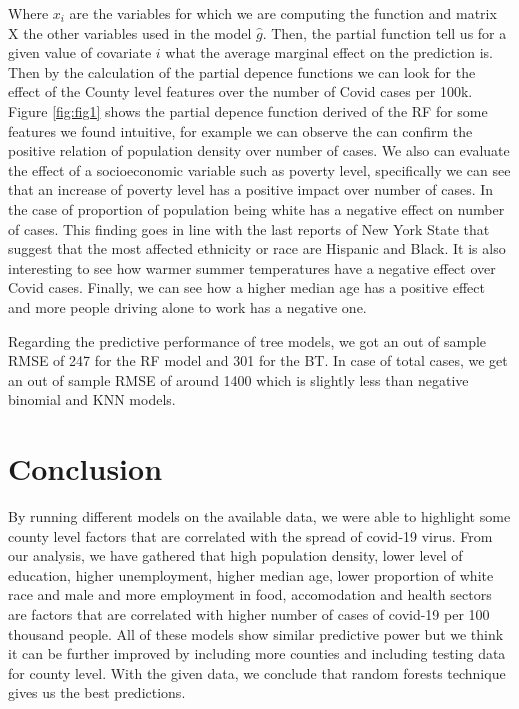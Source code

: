 \documentclass[
]{article}
\begin{document}
Where \(x_i\) are the variables for which we are computing the function
and matrix X the other variables used in the model \(\hat{g}\). Then,
the partial function tell us for a given value of covariate \(i\) what
the average marginal effect on the prediction is. Then by the
calculation of the partial depence functions we can look for the effect
of the County level features over the number of Covid cases per 100k.
Figure \ref{fig:fig1} shows the partial depence function derived of the
RF for some features we found intuitive, for example we can observe the
can confirm the positive relation of population density over number of
cases. We also can evaluate the effect of a socioeconomic variable such
as poverty level, specifically we can see that an increase of poverty
level has a positive impact over number of cases. In the case of
proportion of population being white has a negative effect on number of
cases. This finding goes in line with the last reports of New York State
that suggest that the most affected ethnicity or race are Hispanic and
Black. It is also interesting to see how warmer summer temperatures have
a negative effect over Covid cases. Finally, we can see how a higher
median age has a positive effect and more people driving alone to work
has a negative one.

Regarding the predictive performance of tree models, we got an out of
sample RMSE of 247 for the RF model and 301 for the BT. In case of total
cases, we get an out of sample RMSE of around 1400 which is slightly
less than negative binomial and KNN models.

\hypertarget{conclusion}{%
\section{Conclusion}\label{conclusion}}

By running different models on the available data, we were able to
highlight some county level factors that are correlated with the spread
of covid-19 virus. From our analysis, we have gathered that high
population density, lower level of education, higher unemployment,
higher median age, lower proportion of white race and male and more
employment in food, accomodation and health sectors are factors that are
correlated with higher number of cases of covid-19 per 100 thousand
people. All of these models show similar predictive power but we think
it can be further improved by including more counties and including
testing data for county level. With the given data, we conclude that
random forests technique gives us the best predictions.
\end{document}
